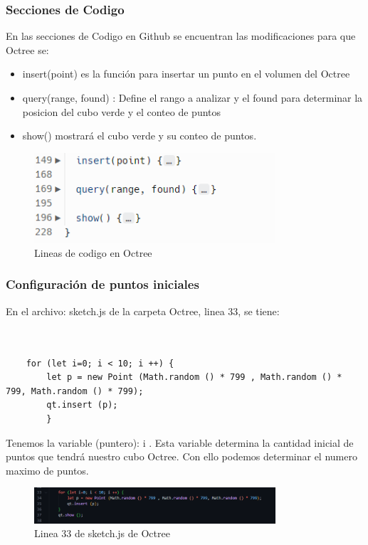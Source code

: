 \documentclass{article}
\begin{document}
\subsubsection{Secciones de Codigo}

En las secciones de Codigo en Github se encuentran las modificaciones para que Octree se:

\begin{itemize}
    \item insert(point) es la función para insertar un punto en el volumen del Octree
    \item query(range, found) : Define el rango a analizar y el found para determinar la posicion del cubo verde y el conteo de puntos
    \item show() mostrará el cubo verde y su conteo de puntos.
\end{itemize}

\begin{figure}[H]
\centering
\includegraphics[width=0.8\textwidth]{img/oct_code.png}
\caption{Lineas de codigo en Octree}
\end{figure}



\subsubsection{Configuración de puntos iniciales}

En el archivo: sketch.js de la carpeta Octree, linea 33, se tiene:

\begin{verbatim}


    for (let i=0; i < 10; i ++) {
        let p = new Point (Math.random () * 799 , Math.random () * 799, Math.random () * 799);
        qt.insert (p);
        }
\end{verbatim}

Tenemos la variable (puntero): i . Esta variable determina la cantidad inicial de puntos que tendrá nuestro cubo Octree. Con ello podemos determinar el numero maximo de puntos.

\begin{figure}[H]
\centering
\includegraphics[width=0.8\textwidth]{img/oct_linea33.png}
\caption{Linea 33 de sketch.js de Octree}
\end{figure}
\end{document}
